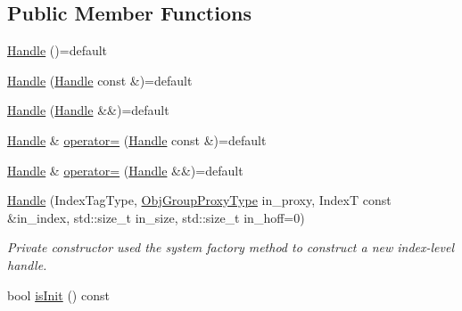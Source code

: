 \subsection*{Public Member Functions}
\begin{DoxyCompactItemize}
\item 
\hyperlink{structvt_1_1rdma_1_1_handle_3_01_t_00_01_e_00_01_index_t_00_01typename_01std_1_1enable__if__t_3_f66c3940d9f3649c3a5c3e77d63c658a_abdfe9dcf8a155c7e2bd91dabf6472702}{Handle} ()=default
\item 
\hyperlink{structvt_1_1rdma_1_1_handle_3_01_t_00_01_e_00_01_index_t_00_01typename_01std_1_1enable__if__t_3_f66c3940d9f3649c3a5c3e77d63c658a_a9362a80316cbbc4527bc1b93f24a5a0b}{Handle} (\hyperlink{structvt_1_1rdma_1_1_handle}{Handle} const \&)=default
\item 
\hyperlink{structvt_1_1rdma_1_1_handle_3_01_t_00_01_e_00_01_index_t_00_01typename_01std_1_1enable__if__t_3_f66c3940d9f3649c3a5c3e77d63c658a_a730e0d6dab39e85472500ad7e04add58}{Handle} (\hyperlink{structvt_1_1rdma_1_1_handle}{Handle} \&\&)=default
\item 
\hyperlink{structvt_1_1rdma_1_1_handle}{Handle} \& \hyperlink{structvt_1_1rdma_1_1_handle_3_01_t_00_01_e_00_01_index_t_00_01typename_01std_1_1enable__if__t_3_f66c3940d9f3649c3a5c3e77d63c658a_a9ebc139217531d3fe1d6d1cc1b824daf}{operator=} (\hyperlink{structvt_1_1rdma_1_1_handle}{Handle} const \&)=default
\item 
\hyperlink{structvt_1_1rdma_1_1_handle}{Handle} \& \hyperlink{structvt_1_1rdma_1_1_handle_3_01_t_00_01_e_00_01_index_t_00_01typename_01std_1_1enable__if__t_3_f66c3940d9f3649c3a5c3e77d63c658a_a29355ec3a0a21b03da7b2b2098b5ad88}{operator=} (\hyperlink{structvt_1_1rdma_1_1_handle}{Handle} \&\&)=default
\item 
\hyperlink{structvt_1_1rdma_1_1_handle_3_01_t_00_01_e_00_01_index_t_00_01typename_01std_1_1enable__if__t_3_f66c3940d9f3649c3a5c3e77d63c658a_aa7de4d0e334b4c69c316f57d003d2429}{Handle} (Index\+Tag\+Type, \hyperlink{namespacevt_ad7cae989df485fccca57f0792a880a8e}{Obj\+Group\+Proxy\+Type} in\+\_\+proxy, IndexT const \&in\+\_\+index, std\+::size\+\_\+t in\+\_\+size, std\+::size\+\_\+t in\+\_\+hoff=0)
\begin{DoxyCompactList}\small\item\em Private constructor used the system factory method to construct a new index-\/level handle. \end{DoxyCompactList}\item 
bool \hyperlink{structvt_1_1rdma_1_1_handle_3_01_t_00_01_e_00_01_index_t_00_01typename_01std_1_1enable__if__t_3_f66c3940d9f3649c3a5c3e77d63c658a_a8757ffe8f60317fccb422db99ee048e5}{is\+Init} () const

\end{DoxyCompactItemize}
